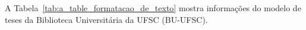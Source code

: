 A Tabela~\ref{tab:a_table_formatacao_de_texto} mostra  informações do modelo de teses da Biblioteca Universitária da UFSC (BU-UFSC).

%
%
%
%
%
%
\setlength\extrarowheight{2pt}
